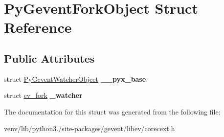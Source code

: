 \hypertarget{struct_py_gevent_fork_object}{}\section{Py\+Gevent\+Fork\+Object Struct Reference}
\label{struct_py_gevent_fork_object}
\subsection*{Public Attributes}
\begin{DoxyCompactItemize}
\item 
\mbox{\label{struct_py_gevent_fork_object_ac2d84f5b2f068b8572e1da5c805df44c}} 
struct \hyperlink{struct_py_gevent_watcher_object}{Py\+Gevent\+Watcher\+Object} {\bfseries \+\_\+\+\_\+pyx\+\_\+base}
\item 
\mbox{\label{struct_py_gevent_fork_object_a2f6fe82b4fe0092eea83a27daa3a94fd}} 
struct \hyperlink{structev__fork}{ev\+\_\+fork} {\bfseries \+\_\+watcher}
\end{DoxyCompactItemize}


The documentation for this struct was generated from the following file\+:\begin{DoxyCompactItemize}
\item 
venv/lib/python3./site-\/packages/gevent/libev/corecext.\+h\end{DoxyCompactItemize}
